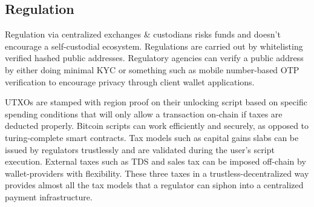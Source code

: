 \documentclass[../Bitcoin Blink.tex]{subfiles}
\begin{document}
\subsection{Regulation}
Regulation via centralized exchanges \& custodians risks funds and doesn't encourage a self-custodial ecosystem. Regulations are carried out by whitelisting verified hashed public addresses. Regulatory agencies can verify a public address by either doing minimal KYC or something such as mobile number-based OTP verification to encourage privacy through client wallet applications.

UTXOs are stamped with region proof on their unlocking script based on specific spending conditions that will only allow a transaction on-chain if taxes are deducted properly. Bitcoin scripts can work efficiently and securely, as opposed to turing-complete smart contracts. Tax models such as capital gains slabs can be issued by regulators trustlessly and are validated during the user's script execution. External taxes such as TDS and sales tax can be imposed off-chain by wallet-providers with flexibility. These three taxes in a trustless-decentralized way provides almost all the tax models that a regulator can siphon into a centralized payment infrastructure.
\end{document}
